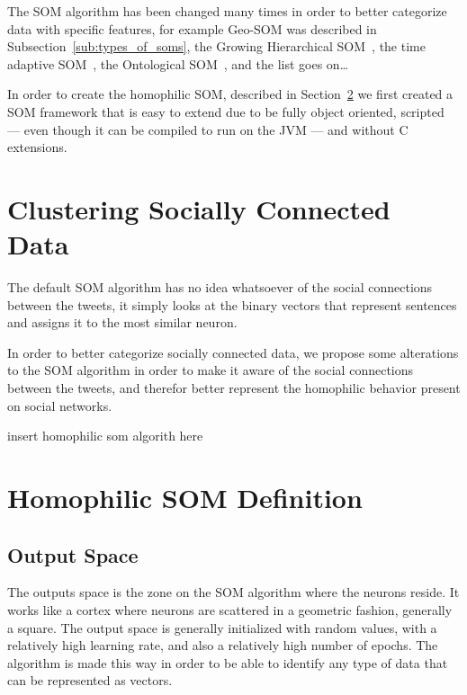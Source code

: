 The \ac{SOM} algorithm has been changed many times in order to better categorize data with specific features, for example Geo-SOM was described in Subsection~\ref{sub:types_of_soms}, the Growing Hierarchical SOM~\cite[]{1058070}, the time adaptive SOM~\cite[]{1187438}, the Ontological SOM~\cite[]{5446427}, and the list goes on\dots  

In order to create the homophilic SOM, described in Section~\ref{sec:algorithm_changes} we first created a SOM framework that is easy to extend due to be fully object oriented, scripted --- even though it can be compiled to run on the JVM --- and without C extensions.


\section{Clustering Socially Connected Data}
The default \ac{SOM} algorithm has no idea whatsoever of the social connections between the tweets, it simply looks at the binary vectors that represent sentences and assigns it to the most similar neuron.

In order to better categorize socially connected data, we propose some alterations to the \ac{SOM} algorithm in order to make it aware of the social connections between the tweets, and therefor better represent the homophilic behavior present on social networks.

{\color{red} insert homophilic som algorith here}

\section{Homophilic SOM Definition}
\label{sec:algorithm_changes}

\subsection{Output Space}
\label{sub:output_space}
The outputs space is the zone on the \ac{SOM} algorithm where the neurons reside. It works like a cortex where neurons are scattered in a geometric fashion, generally a square. The output space is generally initialized with random values, with a relatively high learning rate, and also a relatively high number of epochs. The algorithm is made this way in order to be able to identify any type of data that can be represented as vectors.

